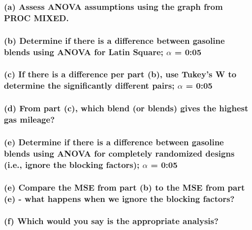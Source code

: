 \documentclass{article}
\begin{document}
\subsubsection*{(a) Assess ANOVA assumptions using the graph from PROC MIXED.}

\subsubsection*{(b) Determine if there is a difference between gasoline blends using ANOVA for Latin Square; $\alpha$ = 0:05}

\subsubsection*{(c) If there is a difference per part (b), use Tukey's W to determine the significantly different pairs; $\alpha$ = 0:05}

\subsubsection*{(d) From part (c), which blend (or blends) gives the highest gas mileage?}

\subsubsection*{(e) Determine if there is a difference between gasoline blends using ANOVA for completely randomized designs (i.e., ignore the blocking factors); $\alpha$ = 0:05}

\subsubsection*{(e) Compare the MSE from part (b) to the MSE from part (e) - what happens when we ignore the blocking factors? }

\subsubsection*{(f) Which would you say is the appropriate analysis?}


\end{document}

